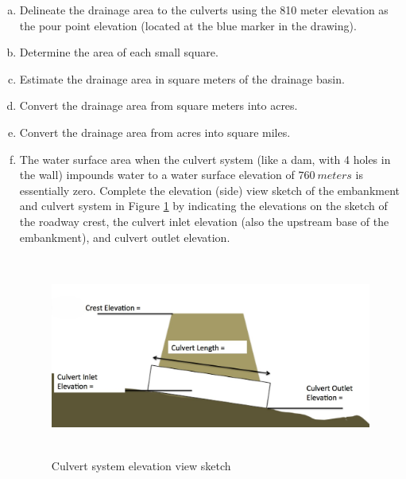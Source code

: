 \documentclass[12pt]{article}
\begin{document}
\begin{enumerate}
\begin{enumerate}[a)]
\item Delineate the drainage area to the culverts using the 810 meter elevation as the pour point elevation (located at the blue marker in the drawing).
\item Determine the area of each small square.
~\newline
~\newline
~\newline
~\newline
\item Estimate the drainage area in square meters of the drainage basin.  
~\newline
~\newline
~\newline
~\newline
\item Convert the drainage area from square meters into acres.   
~\newline
~\newline
~\newline
~\newline
\item Convert the drainage area from acres into square miles.   
~\newline
~\newline
~\newline
~\newline
\item The water surface area when the culvert system (like a dam, with 4 holes in the wall) impounds water to a water surface elevation of $760~meters$ is essentially zero.  Complete the elevation (side) view sketch of the embankment and culvert system in Figure \ref{fig:CulvertSystemElevation} by indicating the elevations on the sketch of the roadway crest, the culvert inlet elevation (also the upstream base of the embankment), and culvert outlet elevation.
\begin{figure}[h!] %
   \centering
   \includegraphics[height=2.6in]{CulvertSystemElevation.jpg} 
   \caption{Culvert system elevation view sketch}
   \label{fig:CulvertSystemElevation}
\end{figure}
\clearpage


\end{enumerate}
\end{enumerate}
\end{document}
